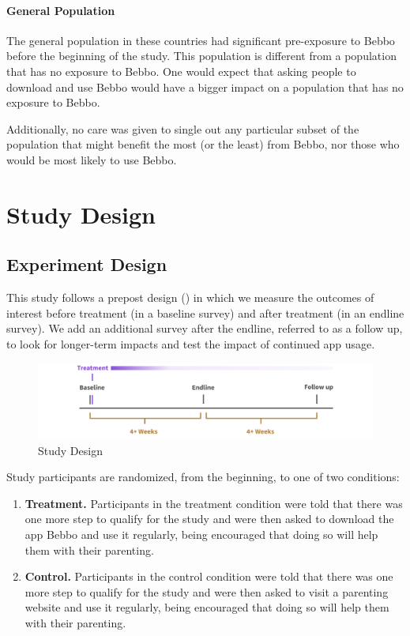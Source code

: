 \message{ !name(bebbo.tex)}\documentclass{article}
\begin{document}
\paragraph*{General Population}
The general population in these countries had significant pre-exposure to Bebbo before the beginning of the study. This population is different from a population that has no exposure to Bebbo. One would expect that asking people to download and use Bebbo would have a bigger impact on a population that has no exposure to Bebbo.

Additionally, no care was given to single out any particular subset of the population that might benefit the most (or the least) from Bebbo, nor those who would be most likely to use Bebbo.


\section{Study Design}

\subsection*{Experiment Design}

This study follows a prepost design (\cite{Clifford2021}) in which we measure the outcomes of interest before treatment (in a baseline survey) and after treatment (in an endline survey). We add an additional survey after the endline, referred to as a follow up, to look for longer-term impacts and test the impact of continued app usage.


\vspace{1cm}

\begin{figure}[h]
\includegraphics[width=\textwidth]{images/design-timeline.png}
\caption{Study Design}
\label{fig:Study Design}
\end{figure}


\noindent Study participants are randomized, from the beginning, to one of two conditions:

\begin{enumerate}
\item \textbf{Treatment.} Participants in the treatment condition were told that there was one more step to qualify for the study and were then asked to download the app Bebbo and use it regularly, being encouraged that doing so will help them with their parenting.
\item \textbf{Control.} Participants in the control condition were told that there was one more step to qualify for the study and were then asked to visit a parenting website and use it regularly, being encouraged that doing so will help them with their parenting.
\end{enumerate}
\end{document}
